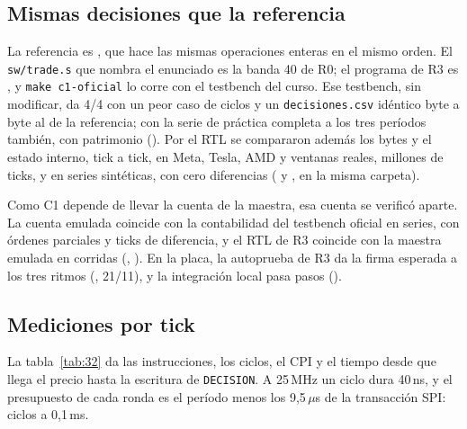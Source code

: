 \subsection{Mismas decisiones que la referencia}

La referencia es , que hace las mismas operaciones enteras en el mismo orden. El \texttt{sw/trade.s} que nombra el enunciado es la banda 40 de R0; el programa de R3 es , y \texttt{make c1-oficial} lo corre con el testbench del curso. Ese testbench, sin modificar, da 4/4 con un peor caso de \ctresOficialPeor{} ciclos y un \texttt{decisiones.csv} idéntico byte a byte al de la referencia; con la serie de práctica completa a los tres períodos también, con patrimonio \ctresPracticaW{} (). Por el RTL se compararon además los bytes y el estado interno, tick a tick, en Meta, Tesla, AMD y \ctresPuertaBVentanas{} ventanas reales, \ctresPuertaBTicks{} millones de ticks, y en \ctresSinteticasRtl{} series sintéticas, con cero diferencias ( y , en la misma carpeta).

Como C1 depende de llevar la cuenta de la maestra, esa cuenta se verificó aparte. La cuenta emulada coincide con la contabilidad del testbench oficial en \ctresContSeries{} series, con \ctresContParciales{} órdenes parciales y \ctresContDiferencias{} ticks de diferencia, y el RTL de R3 coincide con la maestra emulada en \ctresContRtl{} corridas (, ). En la placa, la autoprueba de R3 da la firma esperada a los tres ritmos (, 21/11), y la integración local pasa \ctresIntegracionLocal{} pasos ().

\subsection{Mediciones por tick}\label{sec:ticks}

La tabla~\ref{tab:32} da las instrucciones, los ciclos, el CPI y el tiempo desde que llega el precio hasta la escritura de \texttt{DECISION}. A 25\,MHz un ciclo dura 40\,ns, y el presupuesto de cada ronda es el período menos los 9,5\,$\mu$s de la transacción SPI: \ctresPresupuesto{} ciclos a 0,1\,ms.

\begin{table}[H]\centering
\caption{Instrucciones, ciclos, CPI y tiempo por tick de R3, promedio y peor caso, en las tres rondas.}\label{tab:32}
\par\smallskip

\end{table}

